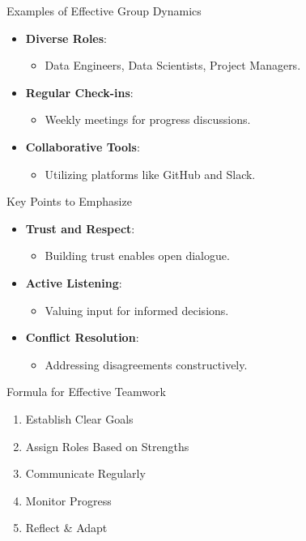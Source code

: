\documentclass[aspectratio=169]{beamer}
\begin{document}
\begin{frame}[fragile]{Examples of Effective Group Dynamics}
  \begin{itemize}
    \item \textbf{Diverse Roles}:
      \begin{itemize}
        \item Data Engineers, Data Scientists, Project Managers.
      \end{itemize}
  
    \item \textbf{Regular Check-ins}:
      \begin{itemize}
        \item Weekly meetings for progress discussions.
      \end{itemize}
  
    \item \textbf{Collaborative Tools}:
      \begin{itemize}
        \item Utilizing platforms like GitHub and Slack.
      \end{itemize}
  \end{itemize}
\end{frame}

\begin{frame}[fragile]{Key Points to Emphasize}
  \begin{itemize}
    \item \textbf{Trust and Respect}:
      \begin{itemize}
        \item Building trust enables open dialogue.
      \end{itemize}
    
    \item \textbf{Active Listening}:
      \begin{itemize}
        \item Valuing input for informed decisions.
      \end{itemize}
    
    \item \textbf{Conflict Resolution}:
      \begin{itemize}
        \item Addressing disagreements constructively.
      \end{itemize}
  \end{itemize}
\end{frame}

\begin{frame}[fragile]{Formula for Effective Teamwork}
  \begin{enumerate}
    \item Establish Clear Goals
    \item Assign Roles Based on Strengths
    \item Communicate Regularly
    \item Monitor Progress
    \item Reflect \& Adapt
  \end{enumerate}
\end{frame}
\end{document}

